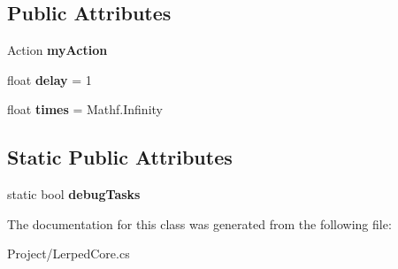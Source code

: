 \subsection*{Public Attributes}
\begin{DoxyCompactItemize}
\item 
\mbox{\label{class_lerp2_a_p_i_1_1_cron_task_a4c4b35ea4dd55fd5a7f1d2eabeb72d66}} 
Action {\bfseries my\+Action}
\item 
\mbox{\label{class_lerp2_a_p_i_1_1_cron_task_a58cdee6758ca49fa0a1c1f00eb71bdf3}} 
float {\bfseries delay} = 1
\item 
\mbox{\label{class_lerp2_a_p_i_1_1_cron_task_a1118024b2ed058a9189b530648de579c}} 
float {\bfseries times} = Mathf.\+Infinity
\end{DoxyCompactItemize}
\subsection*{Static Public Attributes}
\begin{DoxyCompactItemize}
\item 
\mbox{\label{class_lerp2_a_p_i_1_1_cron_task_a3d644a344616e7f4b5c9034369294db2}} 
static bool {\bfseries debug\+Tasks}
\end{DoxyCompactItemize}


The documentation for this class was generated from the following file\+:\begin{DoxyCompactItemize}
\item 
Project/Lerped\+Core.\+cs\end{DoxyCompactItemize}
